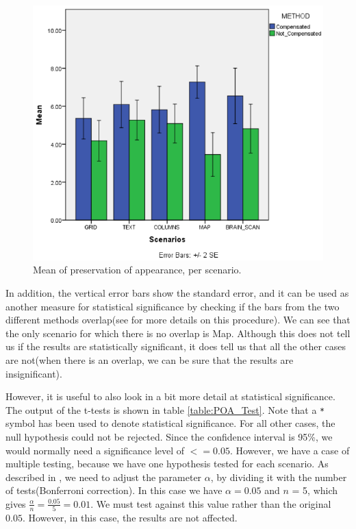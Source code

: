 \documentclass[]{article}
\begin{document}
\begin{figure}[!h]
    \centering
    \includegraphics[width=1.0\textwidth]{figures/results/POA_Graph.PNG}
    \caption{Mean of preservation of appearance, per scenario.}
    \label{fig:POA_Graph}
\end{figure}

In addition, the vertical error bars show the standard error, and it can be used as another measure for statistical significance by checking if the bars from the two different methods overlap(see \cite{error_bars} for more details on this procedure). We can see that the only scenario for which there is no overlap is Map. Although this does not tell us if the results are statistically significant, it does tell us that all the other cases are not(when there is an overlap, we can be sure that the results are insignificant).

However, it is useful to also look in a bit more detail at statistical significance. The output of the t-tests is shown in table \ref{table:POA_Test}. Note that a \verb|*| symbol has been used to denote statistical significance. For all other cases, the null hypothesis could not be rejected. Since the confidence interval is 95\%, we would normally need a significance level of $<= 0.05$. However, we have a case of multiple testing, because we have one hypothesis tested for each scenario. As described in \cite{bonferroni}, we need to adjust the parameter $\alpha$, by dividing it with the number of tests(Bonferroni correction). In this case we have $\alpha = 0.05$ and $n$ = 5, which gives $\frac{\alpha}{n} = \frac{0.05}{5} = 0.01$. We must test against this value rather than the original $0.05$. However, in this case, the results are not affected.
\end{document}
